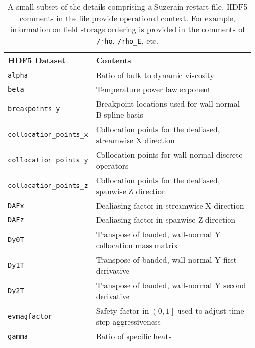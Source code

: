 \begin{table}
\centering
\caption[Instantaneous fields and other details comprising a restart file]{%
  A small subset of the details comprising a Suzerain restart file.
  HDF5 comments in the file provide operational context.  For example,
  information on field storage ordering is provided in the comments of
  \texttt{/rho}, \texttt{/rho\_E}, etc.\label{tbl:restartfile}
}
\begin{small}
\begin{tabular}{p{}|p{}}
HDF5 Dataset & Contents \\ \hline \hline
\texttt{alpha                 } & Ratio of bulk to dynamic viscosity \\
\texttt{beta                  } & Temperature power law exponent \\
\texttt{breakpoints\_y        } & Breakpoint locations used for wall-normal B-spline basis \\
\texttt{collocation\_points\_x} & Collocation points for the dealiased, streamwise X direction \\
\texttt{collocation\_points\_y} & Collocation points for wall-normal discrete operators \\
\texttt{collocation\_points\_z} & Collocation points for the dealiased, spanwise Z direction \\
\texttt{DAFx                  } & Dealiasing factor in streamwise X direction \\
\texttt{DAFz                  } & Dealiasing factor in spanwise Z direction \\
\texttt{Dy0T                  } & Transpose of banded, wall-normal Y collocation mass matrix \\
\texttt{Dy1T                  } & Transpose of banded, wall-normal Y first derivative \\
\texttt{Dy2T                  } & Transpose of banded, wall-normal Y second derivative \\
\texttt{evmagfactor           } & Safety factor in $\left(0,1\right]$ used to adjust time step aggressiveness \\
\texttt{gamma                 } & Ratio of specific heats \\

\end{tabular}
\end{small}
\end{table}
